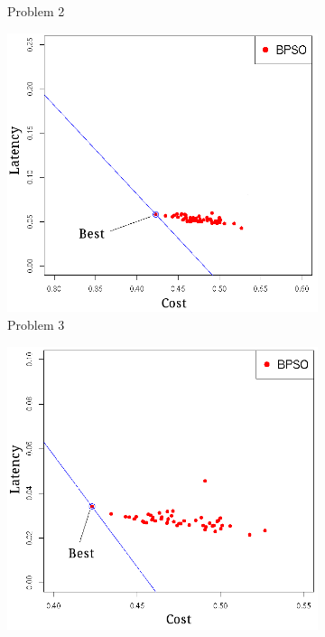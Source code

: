 \begin{figure}[!h]
\begin{subfigure}{0.3\textwidth}
	   \caption{Problem 2}
   \end{subfigure}
   \begin{subfigure}{0.3\textwidth}
       \includegraphics[width=\textwidth]{pics/binary3.png}
	   \caption{Problem 3}
   \end{subfigure}
   \begin{subfigure}{0.3\textwidth}
       \includegraphics[width=\textwidth]{pics/binary4.png}

\end{subfigure}
\end{figure}
